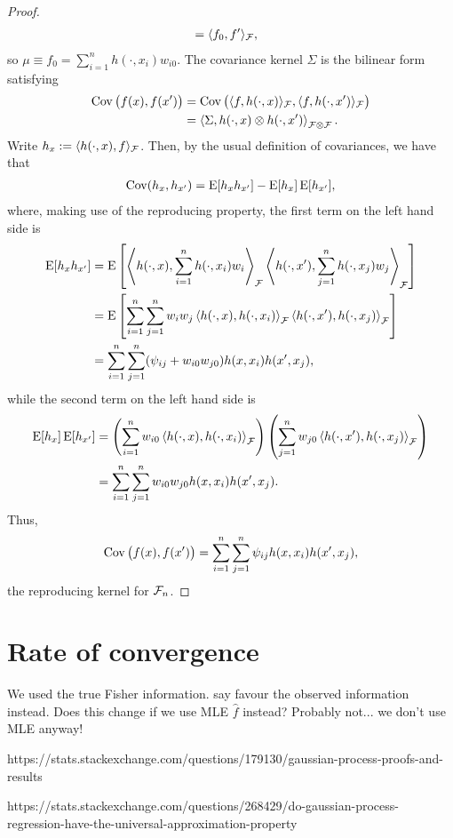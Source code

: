 \documentclass[a4paper,showframe,11pt,draft]{report}
\begin{document}
\begin{proof}
\begin{align*}
    &= \langle f_0,f' \rangle_{{\mathcal F}},
  \end{align*}
  so $\mu \equiv f_0 = \sum_{i=1}^n h(\cdot,x_i)w_{i0}$. 
  The covariance kernel $\Sigma$ is the bilinear form satisfying
  \begin{align*}
    \operatorname{Cov}\big(f(x),f(x')\big) 
    &= \operatorname{Cov}\big(\langle f,h(\cdot,x)\rangle_{{\mathcal F}}, \langle f,h(\cdot,x')\rangle_{{\mathcal F}} \big) \\
    &= \left\langle \Sigma, h(\cdot,x) \otimes h(\cdot,x') \right\rangle_{{\mathcal F} \otimes {\mathcal F}}.
  \end{align*}
  Write $h_{x} := \langle h(\cdot,x),f \rangle_{{\mathcal F}}$. 
  Then, by the usual definition of covariances, we have that 
  \begin{align*}
    \operatorname{Cov}(h_x,h_{x'}) = \operatorname{E}[h_xh_{x'}] - \operatorname{E}[h_x]\operatorname{E}[h_{x'}],
  \end{align*}
  where, making use of the reproducing property, the first term on the left hand side is
  \begin{align*}
    \operatorname{E}[h_xh_{x'}] 
    &= \operatorname{E} \left[ 
    \left\langle h(\cdot,x), \sum_{i=1}^n h(\cdot,x_i)w_i \right\rangle_{{\mathcal F}} 
    \left\langle h(\cdot,x'), \sum_{j=1}^n h(\cdot,x_j)w_j \right\rangle_{{\mathcal F}} 
    \right] \\
    &= \operatorname{E} \left[ 
    \sum_{i=1}^n\sum_{j=1}^n w_iw_j \left\langle  h(\cdot,x), h(\cdot,x_i) \right\rangle_{{\mathcal F}} 
     \left\langle h(\cdot,x'), h(\cdot,x_j)\right\rangle_{{\mathcal F}} 
    \right] \\
    &= \sum_{i=1}^n\sum_{j=1}^n (\psi_{ij} + w_{i0}w_{j0}) h(x,x_i) h(x',x_j),
  \end{align*}
  while the second term on the left hand side is
  \begin{align*}
    \operatorname{E}[h_x]\operatorname{E}[h_{x'}]
    &= \left( \sum_{i=1}^n w_{i0} \left\langle  h(\cdot,x), h(\cdot,x_i)  \right\rangle_{{\mathcal F}} \right)
    \left( \sum_{j=1}^n w_{j0} \left\langle  h(\cdot,x'), h(\cdot,x_j)  \right\rangle_{{\mathcal F}} \right) \\
    &= \sum_{i=1}^n \sum_{j=1}^n w_{i0}w_{j0} h(x,x_i)h(x',x_j).
  \end{align*}  
  Thus,
  \[
    \operatorname{Cov}\big( f(x),f(x') \big) = \sum_{i=1}^n\sum_{j=1}^n \psi_{ij} h(x,x_i) h(x',x_j),
  \]
  the reproducing kernel for ${\mathcal F}_n$.
\end{proof}




\section{Rate of convergence}

We used the true Fisher information. \citet{efron1978assessing} say favour the observed information instead. Does this change if we use MLE $\hat f$ instead? Probably not... we don't use MLE anyway!

https://stats.stackexchange.com/questions/179130/gaussian-process-proofs-and-results

https://stats.stackexchange.com/questions/268429/do-gaussian-process-regression-have-the-universal-approximation-property


\newpage


\hClosingStuffStandalone
\end{document}
